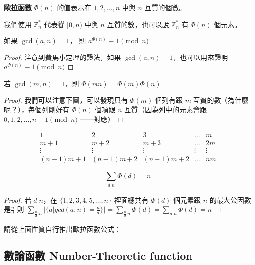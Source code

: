 \begin{definition}
\textbf{歐拉函數} $\Phi(n)$ 的值表示在 $1,2,\ldots,n$ 中與 $n$ 互質的個數。
\end{definition}

我們使用 $\mathbb Z_n^*$ 代表從 $[0,n)$ 中與 $n$ 互質的數，也可以說 $\mathbb Z_n^*$ 有 $\Phi(n)$ 個元素。

\begin{theorem}[Euler]
如果 $\gcd(a,n)=1$， 則 $a^{\Phi(n)}\equiv 1\pmod n$
\end{theorem}
\begin{proof}
注意到費馬小定理的證法，如果 $\gcd(a,n)=1$，也可以用來證明 $a^{\Phi(n)}\equiv 1\pmod n$
\end{proof}

\begin{theorem}
若 $\gcd(m,n)=1$，則 $\Phi(mn)=\Phi(m)\Phi(n)$
\end{theorem}
\begin{proof}
我們可以注意下圖，可以發現只有 $\Phi(m)$ 個列有跟 $m$ 互質的數（為什麼呢？），每個列剛好有 $\Phi(n)$ 個項跟 $n$ 互質（因為列中的元素會跟 $0,1,2,\ldots,n-1\pmod n$ 一一對應）
\end{proof}
$$
\begin{array}{ccccc}		
   1 & 2 & 3 & \dots & m \\		
   m+1 & m+2 & m+3 & \dots & 2m \\	
   \vdots & \vdots & \vdots & \vdots & \vdots \\
   (n-1)m+1 & (n-1)m+2 & (n-1)m+2 & \dots & nm 	
\end{array}
$$

\begin{theorem}
$$\sum_{d|n}\Phi(d)=n$$
\end{theorem}
\begin{proof}
若 $d|n$，在 $\{1,2,3,4,5,\ldots,n\}$ 裡面總共有 $\Phi(d)$ 個元素跟 $n$ 的最大公因數是$\frac n d$
則 $\sum_{\frac n d|n} | \{a|gcd(a,n)=\frac n d\}|=\sum_{\frac n d |n}\Phi(d)=\sum_{d|n}\Phi(d)=n$
\end{proof}

請從上面性質自行推出歐拉函數公式：


\subsection{數論函數 Number-Theoretic function}
\label{sec:mod:NTF}

